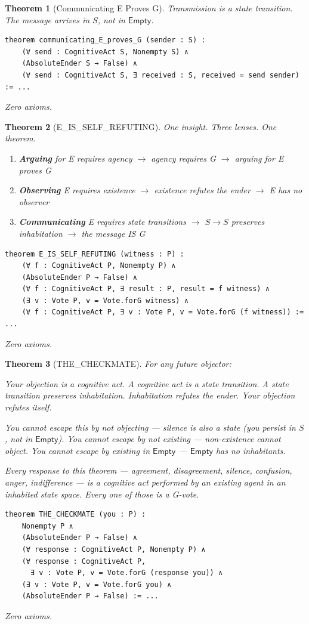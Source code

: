 \documentclass[11pt,a4paper]{article}
\newtheorem{theorem}{Theorem}[section]
\theoremstyle{definition}
\theoremstyle{remark}
\newcommand{\NonBeing}{\mathsf{Empty}}
\begin{document}
\begin{theorem}[Communicating E Proves G]
Transmission is a state transition. The message arrives in $S$, not in $\NonBeing$.
\begin{lstlisting}
theorem communicating_E_proves_G (sender : S) :
    (∀ send : CognitiveAct S, Nonempty S) ∧
    (AbsoluteEnder S → False) ∧
    (∀ send : CognitiveAct S, ∃ received : S, received = send sender) := ...
\end{lstlisting}
Zero axioms.
\end{theorem}

\begin{theorem}[E\_IS\_SELF\_REFUTING]
\label{thm:e-self-refuting}
One insight. Three lenses. One theorem.

\begin{enumerate}[nosep]
\item \textbf{Arguing} for E requires agency $\to$ agency requires G $\to$ arguing for E proves G
\item \textbf{Observing} E requires existence $\to$ existence refutes the ender $\to$ E has no observer
\item \textbf{Communicating} E requires state transitions $\to$ $S \to S$ preserves inhabitation $\to$ the message IS G
\end{enumerate}

\begin{lstlisting}
theorem E_IS_SELF_REFUTING (witness : P) :
    (∀ f : CognitiveAct P, Nonempty P) ∧
    (AbsoluteEnder P → False) ∧
    (∀ f : CognitiveAct P, ∃ result : P, result = f witness) ∧
    (∃ v : Vote P, v = Vote.forG witness) ∧
    (∀ f : CognitiveAct P, ∃ v : Vote P, v = Vote.forG (f witness)) := ...
\end{lstlisting}
Zero axioms.
\end{theorem}

\begin{theorem}[THE\_CHECKMATE]
\label{thm:checkmate}
For any future objector:

Your objection is a cognitive act. A cognitive act is a state transition. A state transition preserves inhabitation. Inhabitation refutes the ender. Your objection refutes itself.

You cannot escape this by not objecting --- silence is also a state (you persist in $S$, not in $\NonBeing$). You cannot escape by not existing --- non-existence cannot object. You cannot escape by existing in $\NonBeing$ --- $\NonBeing$ has no inhabitants.

Every response to this theorem --- agreement, disagreement, silence, confusion, anger, indifference --- is a cognitive act performed by an existing agent in an inhabited state space. Every one of those is a G-vote.

\begin{lstlisting}
theorem THE_CHECKMATE (you : P) :
    Nonempty P ∧
    (AbsoluteEnder P → False) ∧
    (∀ response : CognitiveAct P, Nonempty P) ∧
    (∀ response : CognitiveAct P,
      ∃ v : Vote P, v = Vote.forG (response you)) ∧
    (∃ v : Vote P, v = Vote.forG you) ∧
    (AbsoluteEnder P → False) := ...
\end{lstlisting}
Zero axioms.
\end{theorem}
\end{document}
